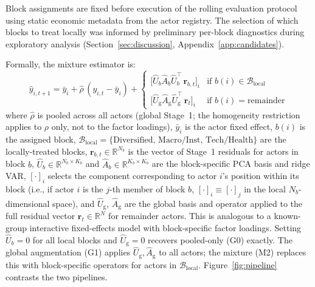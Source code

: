 \documentclass[11pt,a4paper]{article}
\newcommand{\R}{\mathbb{R}}
\begin{document}
Block assignments are fixed before execution of the rolling evaluation protocol using static economic metadata from the actor registry. The selection of which blocks to treat locally was informed by preliminary per-block diagnostics during exploratory analysis (Section~\ref{sec:discussion}, Appendix~\ref{app:candidates}).

Formally, the mixture estimator is:
\begin{equation}
\hat{y}_{i,t+1} = \bar{y}_i + \hat{\rho}\,(y_{i,t} - \bar{y}_i) +
\begin{cases}
\bigl[\hat{U}_b \hat{A}_b \hat{U}_b^\top\, \mathbf{r}_{b,t}\bigr]_i & \text{if } b(i) \in \mathcal{B}_{\mathrm{local}} \\[3pt]
\bigl[\hat{U}_{\mathrm{g}} \hat{A}_{\mathrm{g}} \hat{U}_{\mathrm{g}}^\top\, \mathbf{r}_t\bigr]_i & \text{if } b(i) = \text{remainder}
\end{cases}
\label{eq:mixture}
\end{equation}
where $\hat{\rho}$ is pooled across all actors (global Stage~1; the homogeneity restriction applies to $\rho$ only, not to the factor loadings), $\bar{y}_i$ is the actor fixed effect, $b(i)$ is the assigned block, $\mathcal{B}_{\mathrm{local}} = \{\text{Diversified, Macro/Inst, Tech/Health}\}$ are the locally-treated blocks, $\mathbf{r}_{b,t} \in \R^{N_b}$ is the vector of Stage~1 residuals for actors in block $b$, $\hat{U}_b \in \R^{N_b \times K_b}$ and $\hat{A}_b \in \R^{K_b \times K_b}$ are the block-specific PCA basis and ridge VAR, $[\cdot]_i$ selects the component corresponding to actor $i$'s position within its block (i.e., if actor $i$ is the $j$-th member of block $b$, $[\cdot]_i \equiv [\cdot]_j$ in the local $N_b$-dimensional space), and $\hat{U}_{\mathrm{g}}$, $\hat{A}_{\mathrm{g}}$ are the global basis and operator applied to the full residual vector $\mathbf{r}_t \in \R^N$ for remainder actors. This is analogous to a known-group interactive fixed-effects model \citep{bai2009panel} with block-specific factor loadings. Setting $\hat{U}_b = 0$ for all local blocks and $\hat{U}_{\mathrm{g}} = 0$ recovers pooled-only (G0) exactly. The global augmentation (G1) applies $\hat{U}_{\mathrm{g}}, \hat{A}_{\mathrm{g}}$ to all actors; the mixture (M2) replaces this with block-specific operators for actors in $\mathcal{B}_{\mathrm{local}}$. Figure~\ref{fig:pipeline} contrasts the two pipelines.
\end{document}
